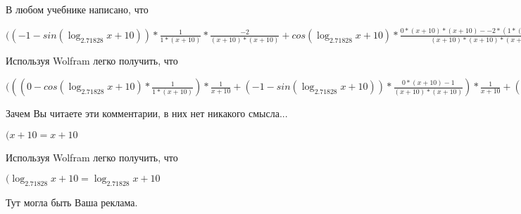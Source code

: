 \documentclass[12pt,a4paper,fleqn]{article}
\theoremstyle{definition}
\begin{document}
В любом учебнике написано, что

$(( -1  - sin(\log_{ 2.71828 }{ x  +  10 })) * \frac{ 1 }{ 1  * ( x  +  10 )}
 * \frac{ -2 }{( x  +  10 ) * ( x  +  10 )}
 + cos(\log_{ 2.71828 }{ x  +  10 }) * \frac{ 0  * ( x  +  10 ) * ( x  +  10 ) -  -2  * ( 1  * ( x  +  10 ) + ( x  +  10 ) *  1 )}{( x  +  10 ) * ( x  +  10 ) * ( x  +  10 ) * ( x  +  10 )}
 = ( -1  - sin(\log_{ 2.71828 }{ x  +  10 })) * \frac{ 1 }{ 1  * ( x  +  10 )}
 * \frac{ -2 }{( x  +  10 ) * ( x  +  10 )}
 + cos(\log_{ 2.71828 }{ x  +  10 }) * \frac{ 0  * ( x  +  10 ) * ( x  +  10 ) -  -2  * ( 1  * ( x  +  10 ) + ( x  +  10 ) *  1 )}{( x  +  10 ) * ( x  +  10 ) * ( x  +  10 ) * ( x  +  10 )}
$

Используя Wolfram легко получить, что

$((( 0  - cos(\log_{ 2.71828 }{ x  +  10 }) * \frac{ 1 }{ 1  * ( x  +  10 )}
) * \frac{ 1 }{ x  +  10 }
 + ( -1  - sin(\log_{ 2.71828 }{ x  +  10 })) * \frac{ 0  * ( x  +  10 ) -  1 }{( x  +  10 ) * ( x  +  10 )}
) * \frac{ 1 }{ x  +  10 }
 + ( -1  - sin(\log_{ 2.71828 }{ x  +  10 })) * \frac{ 1 }{ x  +  10 }
 * \frac{ 0  * ( x  +  10 ) -  1 }{( x  +  10 ) * ( x  +  10 )}
 + ( -1  - sin(\log_{ 2.71828 }{ x  +  10 })) * \frac{ 1 }{ 1  * ( x  +  10 )}
 * \frac{ -2 }{( x  +  10 ) * ( x  +  10 )}
 + cos(\log_{ 2.71828 }{ x  +  10 }) * \frac{ 0  * ( x  +  10 ) * ( x  +  10 ) -  -2  * ( 1  * ( x  +  10 ) + ( x  +  10 ) *  1 )}{( x  +  10 ) * ( x  +  10 ) * ( x  +  10 ) * ( x  +  10 )}
 = (( 0  - cos(\log_{ 2.71828 }{ x  +  10 }) * \frac{ 1 }{ 1  * ( x  +  10 )}
) * \frac{ 1 }{ x  +  10 }
 + ( -1  - sin(\log_{ 2.71828 }{ x  +  10 })) * \frac{ 0  * ( x  +  10 ) -  1 }{( x  +  10 ) * ( x  +  10 )}
) * \frac{ 1 }{ x  +  10 }
 + ( -1  - sin(\log_{ 2.71828 }{ x  +  10 })) * \frac{ 1 }{ x  +  10 }
 * \frac{ 0  * ( x  +  10 ) -  1 }{( x  +  10 ) * ( x  +  10 )}
 + ( -1  - sin(\log_{ 2.71828 }{ x  +  10 })) * \frac{ 1 }{ 1  * ( x  +  10 )}
 * \frac{ -2 }{( x  +  10 ) * ( x  +  10 )}
 + cos(\log_{ 2.71828 }{ x  +  10 }) * \frac{ 0  * ( x  +  10 ) * ( x  +  10 ) -  -2  * ( 1  * ( x  +  10 ) + ( x  +  10 ) *  1 )}{( x  +  10 ) * ( x  +  10 ) * ( x  +  10 ) * ( x  +  10 )}
$

Зачем Вы читаете эти комментарии, в них нет никакого смысла...

$( x  +  10  =  x  +  10 $

Используя Wolfram легко получить, что

$(\log_{ 2.71828 }{ x  +  10 } = \log_{ 2.71828 }{ x  +  10 }$

Тут могла быть Ваша реклама.
\end{document}
